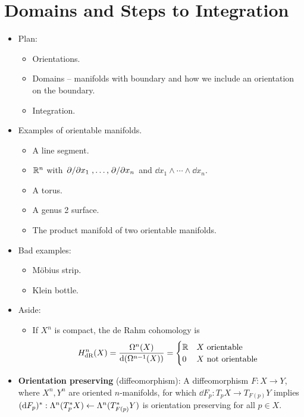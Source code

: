 \documentclass[../notes.tex]{subfiles}
\begin{document}
\section{Domains and Steps to Integration}
\begin{itemize}
    \item {}Plan:
    \begin{itemize}
        \item Orientations.
        \item Domains -- manifolds with boundary and how we include an orientation on the boundary.
        \item Integration.
    \end{itemize}
    \item Examples of orientable manifolds.
    \begin{itemize}
        \item A line segment.
        \item $\R^n$ with $\pdv*{x_1},\dots,\pdv*{x_n}$ and $\dd{x_1}\wedge\cdots\wedge\dd{x_n}$.
        \item A torus.
        \item A genus 2 surface.
        \item The product manifold of two orientable manifolds.
    \end{itemize}
    \item Bad examples:
    \begin{itemize}
        \item M\"{o}bius strip.
        \item Klein bottle.
    \end{itemize}
    \item Aside:
    \begin{itemize}
        \item If $X^n$ is compact, the de Rahm cohomology is
        \begin{equation*}
            H^n_\text{dR}(X) = \frac{\ome[n]{X}}{\dd(\ome[n-1]{X})}
            =
            \begin{cases}
                \R & X\text{ orientable}\\
                0 & X\text{ not orientable}
            \end{cases}
        \end{equation*}
    \end{itemize}
    \item \textbf{Orientation preserving} (diffeomorphism): A diffeomorphism $F:X\to Y$, where $X^n,Y^n$ are oriented $n$-manifolds, for which $\dd{F_p}:T_pX\to T_{F(p)}Y$ implies $(\dd{F_p})^*:\lam[n]{T_p^*X}\leftarrow\lam[n]{T_{F(p)}^*Y}$ is orientation preserving for all $p\in X$.

\end{itemize}
\end{document}
